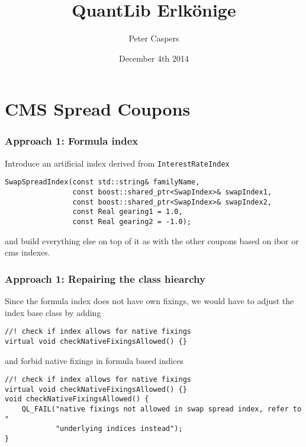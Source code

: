 \documentclass{beamer}
\begin{document}
\title{QuantLib Erlk\"onige}  
\author{Peter Caspers}
\date{December 4th 2014} 

\frame{\titlepage} 



\section{CMS Spread Coupons}


\begin{frame}[fragile]
\frametitle{Approach 1: Formula index}
Introduce an artificial index derived from \verb+InterestRateIndex+
\begin{verbatim}
SwapSpreadIndex(const std::string& familyName,
                const boost::shared_ptr<SwapIndex>& swapIndex1,
                const boost::shared_ptr<SwapIndex>& swapIndex2,
                const Real gearing1 = 1.0,
                const Real gearing2 = -1.0);
\end{verbatim}
and build everything else on top of it as with the other coupons based
on ibor or cms indexes.
\end{frame}

\begin{frame}[fragile]
\frametitle{Approach 1: Repairing the class hiearchy}
Since the formula index does not have own fixings, we would have to
adjust the index base class by adding
\begin{verbatim}
//! check if index allows for native fixings
virtual void checkNativeFixingsAllowed() {}
\end{verbatim}
and forbid native fixings in formula based indices
\begin{verbatim}
//! check if index allows for native fixings
virtual void checkNativeFixingsAllowed() {}
void checkNativeFixingsAllowed() {
    QL_FAIL("native fixings not allowed in swap spread index, refer to "
            "underlying indices instead");
}
\end{verbatim}
\end{frame}
\end{document}
